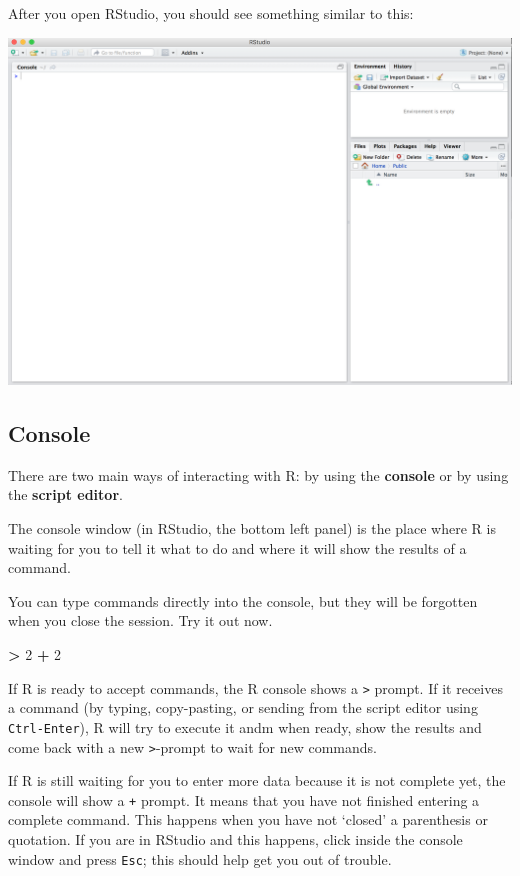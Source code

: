 \documentclass[]{book}
\newenvironment{Shaded}{\begin{snugshade}}{\end{snugshade}}
\newcommand{\DecValTok}[1]{\textcolor[rgb]{0.00,0.00,0.81}{#1}}
\newcommand{\StringTok}[1]{\textcolor[rgb]{0.31,0.60,0.02}{#1}}
\newcommand{\OperatorTok}[1]{\textcolor[rgb]{0.81,0.36,0.00}{\textbf{#1}}}
\begin{document}
After you open RStudio, you should see something similar to this:

\begin{center}\includegraphics[width=0.7\linewidth]{img/rstudio} \end{center}

\subsection{Console}\label{console}

There are two main ways of interacting with R: by using the
\textbf{console} or by using the \textbf{script editor}.

The console window (in RStudio, the bottom left panel) is the place
where R is waiting for you to tell it what to do and where it will show
the results of a command.

You can type commands directly into the console, but they will be
forgotten when you close the session. Try it out now.

\begin{Shaded}
\begin{Highlighting}[]
\OperatorTok{>}\StringTok{ }\DecValTok{2} \OperatorTok{+}\StringTok{ }\DecValTok{2}
\end{Highlighting}
\end{Shaded}

If R is ready to accept commands, the R console shows a
\texttt{\textgreater{}} prompt. If it receives a command (by typing,
copy-pasting, or sending from the script editor using
\texttt{Ctrl-Enter}), R will try to execute it andm when ready, show the
results and come back with a new \texttt{\textgreater{}}-prompt to wait
for new commands.

If R is still waiting for you to enter more data because it is not
complete yet, the console will show a \texttt{+} prompt. It means that
you have not finished entering a complete command. This happens when you
have not `closed' a parenthesis or quotation. If you are in RStudio and
this happens, click inside the console window and press \texttt{Esc};
this should help get you out of trouble.
\end{document}
